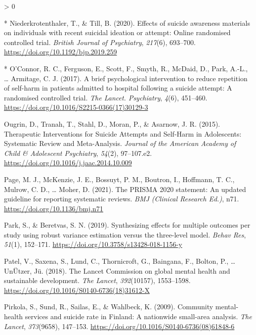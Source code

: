\documentclass[
  english,
  man]{apa6}
\newlength{\cslhangindent}
\newenvironment{CSLReferences}[2] %
 {%
  \setlength{\parindent}{0pt}
  \ifodd #1 \everypar{\setlength{\hangindent}{\cslhangindent}}\ignorespaces\fi
  \ifnum #2 > 0
  \setlength{\parskip}{#2\baselineskip}
  \fi
 }%
 {}
\begin{document}
\begin{CSLReferences}{1}{0}
\leavevmode\hypertarget{ref-niederkrotenthaler2020}{}%
* Niederkrotenthaler, T., \& Till, B. (2020). Effects of suicide awareness materials on individuals with recent suicidal ideation or attempt: Online randomised controlled trial. \emph{British Journal of Psychiatry}, \emph{217}(6), 693--700. \url{https://doi.org/10.1192/bjp.2019.259}

\leavevmode\hypertarget{ref-oconnor2017}{}%
* O'Connor, R. C., Ferguson, E., Scott, F., Smyth, R., McDaid, D., Park, A.-L., \ldots{} Armitage, C. J. (2017). A brief psychological intervention to reduce repetition of self-harm in patients admitted to hospital following a suicide attempt: A randomised controlled trial. \emph{The Lancet. Psychiatry}, \emph{4}(6), 451--460. \url{https://doi.org/10.1016/S2215-0366(17)30129-3}

\leavevmode\hypertarget{ref-ougrin2015}{}%
Ougrin, D., Tranah, T., Stahl, D., Moran, P., \& Asarnow, J. R. (2015). Therapeutic {Interventions} for {Suicide Attempts} and {Self}-{Harm} in {Adolescents}: Systematic {Review} and {Meta}-{Analysis}. \emph{Journal of the American Academy of Child \& Adolescent Psychiatry}, \emph{54}(2), 97--107.e2. \url{https://doi.org/10.1016/j.jaac.2014.10.009}

\leavevmode\hypertarget{ref-page2021}{}%
Page, M. J., McKenzie, J. E., Bossuyt, P. M., Boutron, I., Hoffmann, T. C., Mulrow, C. D., \ldots{} Moher, D. (2021). The {PRISMA} 2020 statement: An updated guideline for reporting systematic reviews. \emph{BMJ (Clinical Research Ed.)}, n71. \url{https://doi.org/10.1136/bmj.n71}

\leavevmode\hypertarget{ref-park2019}{}%
Park, S., \& Beretvas, S. N. (2019). Synthesizing effects for multiple outcomes per study using robust variance estimation versus the three-level model. \emph{Behav Res}, \emph{51}(1), 152--171. \url{https://doi.org/10.3758/s13428-018-1156-y}

\leavevmode\hypertarget{ref-patel2018}{}%
Patel, V., Saxena, S., Lund, C., Thornicroft, G., Baingana, F., Bolton, P., \ldots{} UnÜtzer, Jü. (2018). The {Lancet Commission} on global mental health and sustainable development. \emph{The Lancet}, \emph{392}(10157), 1553--1598. \url{https://doi.org/10.1016/S0140-6736(18)31612-X}

\leavevmode\hypertarget{ref-pirkola2009}{}%
Pirkola, S., Sund, R., Sailas, E., \& Wahlbeck, K. (2009). Community mental-health services and suicide rate in {Finland}: A nationwide small-area analysis. \emph{The Lancet}, \emph{373}(9658), 147--153. \url{https://doi.org/10.1016/S0140-6736(08)61848-6}


\end{CSLReferences}
\end{document}
